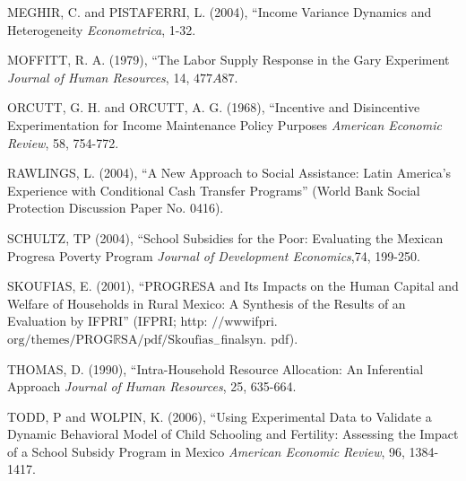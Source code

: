 \documentclass{handoutForSolutions}
\begin{document}
MEGHIR, C. and PISTAFERRI, L. (2004), ``Income Variance Dynamics and Heterogeneity {\it Econometrica}, 1-32.

MOFFITT, R. A. (1979), ``The Labor Supply Response in the Gary Experiment {\it Journal of Human Resources}, 14, $477A87.$

ORCUTT, G. H. and ORCUTT, A. G. (1968), ``Incentive and Disincentive Experimentation for Income Maintenance Policy Purposes {\it American Economic Review}, 58, 754-772.

RAWLINGS, L. (2004), ``A New Approach to Social Assistance: Latin America's Experience with Conditional Cash Transfer Programs'' (World Bank Social Protection Discussion Paper No. 0416).

SCHULTZ, $\mathrm{T} \mathrm{P}$ (2004), ``School Subsidies for the Poor: Evaluating the Mexican Progresa Poverty Program {\it Journal of Development Economics},74, 199-250.

SKOUFIAS, E. (2001), ``PROGRESA and Its Impacts on the Human Capital and Welfare of Households in Rural Mexico: A Synthesis of the Results of an Evaluation by IFPRI'' (IFPRI; http: $//\mathrm{w}\mathrm{w}\mathrm{w}\mathrm{i}$fpri.$\mathrm{o}\mathrm{r}\mathrm{g}/\mathrm{t}\mathrm{h}\mathrm{e}\mathrm{m}\mathrm{e}\mathrm{s}/\mathrm{P}\mathrm{R}\mathrm{O}\mathrm{G}\mathbb{R}\mathrm{S}\mathrm{A}/ \mathrm{p}\mathrm{d}\mathrm{f}/\mathrm{S}\mathrm{k}\mathrm{o}\mathrm{u}\mathrm{f}\mathrm{i}\mathrm{a}\mathrm{s}_{-}$finalsyn. pdf).

THOMAS, D. (1990), ``Intra-Household Resource Allocation: An Inferential Approach {\it Journal of Human Resources}, 25, 635-664.

TODD, $\mathrm{P}$ and WOLPIN, K. (2006), ``Using Experimental Data to Validate a Dynamic Behavioral Model of Child Schooling and Fertility: Assessing the Impact of a School Subsidy Program in Mexico {\it American Economic Review}, 96, 1384-1417.
\end{document}
